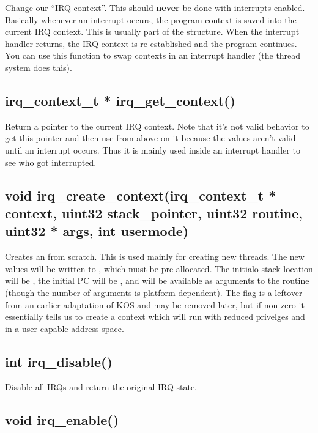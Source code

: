 \documentclass[english]{report}
\begin{document}
Change our ``IRQ context''. This should \textbf{never} be done
with interrupts enabled. Basically whenever an interrupt occurs, the
program context is saved into the current IRQ context. This is usually
part of the  structure. When the interrupt handler returns,
the IRQ context is re-established and the program continues. You can
use this function to swap contexts in an interrupt handler (the thread
system does this).


\subsection{irq\_context\_t * irq\_get\_context()}

Return a pointer to the current IRQ context. Note that it's not valid
behavior to get this pointer and then use  from above
on it because the values aren't valid until an interrupt occurs. Thus
it is mainly used inside an interrupt handler to see who got interrupted.


\subsection{void irq\_create\_context(irq\_context\_t * context, uint32 stack\_pointer,
   uint32 routine, uint32 * args, int usermode)}

Creates an  from scratch. This is used mainly for creating
new threads. The new values will be written to , which
must be pre-allocated. The initialo stack location will be ,
the initial PC will be , and  will be available
as arguments to the routine (though the number of arguments is platform
dependent). The  flag is a leftover from an earlier
adaptation of KOS and may be removed later, but if non-zero it essentially
tells us to create a context which will run with reduced privelges
and in a user-capable address space.


\subsection{int irq\_disable()}

Disable all IRQs and return the original IRQ state.


\subsection{void irq\_enable()}
\end{document}
